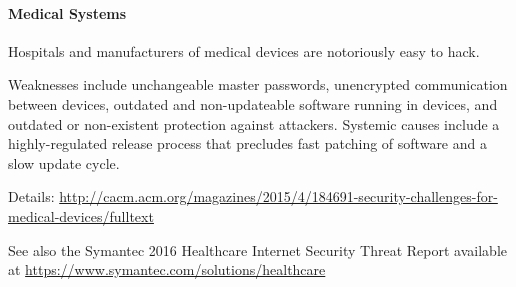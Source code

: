 \paragraph{Medical Systems}
Hospitals and manufacturers of medical devices are notoriously easy to hack.

Weaknesses include unchangeable master passwords, unencrypted communication between devices, outdated and non-updateable software running in devices, and outdated or non-existent protection against attackers.
Systemic causes include a highly-regulated release process that precludes fast patching of software and a slow update cycle.

Details:
\url{http://cacm.acm.org/magazines/2015/4/184691-security-challenges-for-medical-devices/fulltext}

See also the Symantec 2016 Healthcare Internet Security Threat Report available at \url{https://www.symantec.com/solutions/healthcare}

